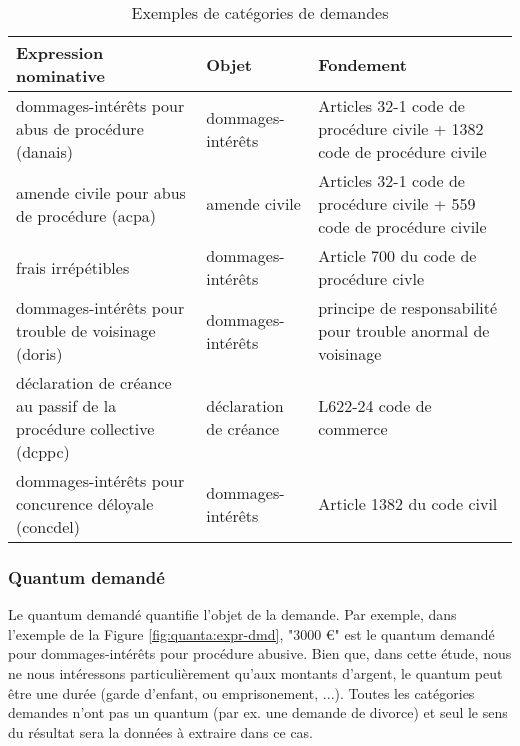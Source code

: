 \begin{table}[h!]
\scriptsize
\begin{tabular}{|p{}|p{}|p{}|}
\hline
\textbf{Expression nominative  }                                     & \textbf{Objet}                                                       & \textbf{Fondement}                                                                 \\ \hline
dommages-intérêts pour abus de procédure (danais)                    & dommages-intérêts                                           & Articles 32-1 code de procédure civile + 1382 code de procédure civile \\ \hline
amende civile pour abus de procédure (acpa)                        & amende civile                                               & Articles 32-1 code de procédure civile + 559 code de procédure civile  \\ \hline
frais irrépétibles                                          & dommages-intérêts                                           & Article 700 du code de procédure civle                                 \\ \hline
dommages-intérêts pour trouble de voisinage (doris)                 & dommages-intérêts                                           & principe de responsabilité pour trouble anormal de voisinage           \\ \hline
déclaration de créance au passif de la procédure collective (dcppc) & déclaration de créance & L622-24 code de commerce                                               \\ \hline
dommages-intérêts pour concurence déloyale (concdel)                  & dommages-intérêts                                           & Article 1382 du code civil                                             \\ \hline
\end{tabular}
\caption{Exemples de catégories de demandes}\label{tab:quanta:exemple-categorie}
\end{table}

\subsubsection{Quantum demandé}
Le quantum demandé quantifie l'objet de la demande. Par exemple, dans l'exemple de la Figure \ref{fig:quanta:expr-dmd}, "3000 \euro{}" est le quantum demandé pour dommages-intérêts pour procédure abusive. Bien que, dans cette étude, nous ne nous intéressons particulièrement qu'aux montants d'argent, le quantum peut être une durée (garde d'enfant, ou emprisonement, ...). Toutes les catégories demandes n'ont pas un quantum (par ex. une demande de divorce) et seul le sens du résultat sera la données à extraire dans ce cas.

